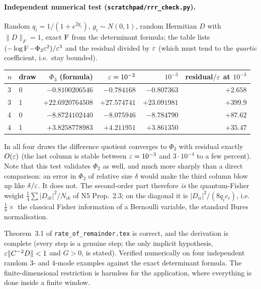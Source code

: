 \documentclass[11pt]{article}
\newcommand{\norm}[1]{\lVert#1\rVert}\newcommand{\abs}[1]{\lvert#1\rvert}
\begin{document}
\paragraph{Independent numerical test (\texttt{scratchpad/rrr\_check.py}).}  Random
$q_i=1/(1+e^{2g_i})$, $g_i\sim N(0,1)$, random Hermitian $D$ with $\norm D_F=1$, exact $\operatorname{F}$ from
the determinant formula; the table lists $(-\log\operatorname{F}-\Phi_2\varepsilon^2)/\varepsilon^3$ and the residual divided
by $\varepsilon$ (which must tend to the \emph{quartic} coefficient, i.e.\ stay bounded).
\begin{center}\small
\begin{tabular}{llrrrr}\toprule
$n$ & draw & $\Phi_3$ (formula) & $\varepsilon=10^{-2}$ & $10^{-3}$ & residual$/\varepsilon$ at $10^{-3}$\\\midrule
3 & 0 & $-0.8100206546$ & $-0.784168$ & $-0.807363$ & $+2.658$\\
3 & 1 & $+22.6920764508$ & $+27.574741$ & $+23.091981$ & $+399.9$\\
4 & 0 & $-8.8724102440$ & $-8.075946$ & $-8.784790$ & $+87.62$\\
4 & 1 & $+3.8258778983$ & $+4.211951$ & $+3.861350$ & $+35.47$\\
\bottomrule\end{tabular}\end{center}
In all four draws the difference quotient converges to $\Phi_3$ with residual exactly $O(\varepsilon)$
(the last column is stable between $\varepsilon=10^{-3}$ and $3\cdot10^{-4}$ to a few percent).  Note that
this test validates $\Phi_2$ as well, and much more sharply than a direct comparison: an error in
$\Phi_2$ of relative size $\delta$ would make the third column blow up like $\delta/\varepsilon$.  It does
not.  The second-order part therefore \emph{is} the quantum-Fisher weight
$\frac14\sum\abs{D_{ik}}^2/N_{ik}$ of N5 Prop.~2.3; on the diagonal it is
$\abs{D_{ii}}^2/(8q_ic_i)$, i.e.\ $\frac18\times$ the classical Fisher information of a Bernoulli
variable, the standard Bures normalisation.

\begin{verdictok}
Theorem~3.1 of \texttt{rate\_of\_remainder.tex} is correct, and the derivation is complete
(every step is a genuine step; the only implicit hypothesis, $\eps\norm{C^{-2}D}<1$ and $G>0$, is
stated).  Verified numerically on four independent random $3$- and $4$-mode examples against the
exact determinant formula.  The finite-dimensional restriction is harmless for the application,
where everything is done inside a finite window.
\end{verdictok}
\end{document}
